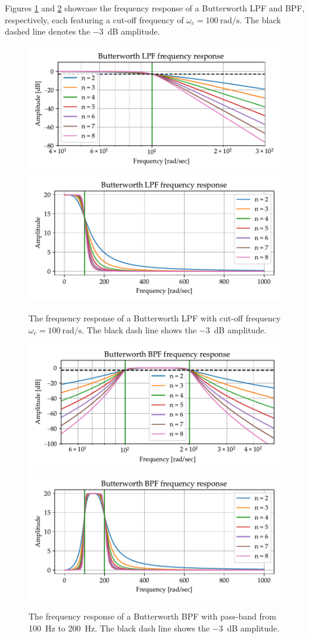 \documentclass[../ECE459FinalProjectReport.tex]{subfiles}
\begin{document}
Figures \ref{fig:butter-lpf} and \ref{fig:butter-bpf} showcase the frequency response of a Butterworth LPF and BPF, respectively, each featuring a cut-off frequency of $\omega_c = \SI{100}{\radian\per\s}$. The black dashed line denotes the \SI{-3}{\dB} amplitude.

\begin{figure}[htb]
    \centering
    \includegraphics[width=0.45\linewidth]{plots/butterworth-lpf.pdf}
    \includegraphics[width=0.45\linewidth]{plots/butterworth-lpf-nolog.pdf}
    \caption{The frequency response of a Butterworth LPF with cut-off frequency $\omega_c = \SI{100}{\radian\per\s}$. The black dash line shows the \SI{-3}{\dB} amplitude.}
    \label{fig:butter-lpf}
\end{figure}
\begin{figure}[htb]
    \centering
    \includegraphics[width=0.45\linewidth]{plots/butterworth-bpf.pdf}
    \includegraphics[width=0.45\linewidth]{plots/butterworth-bpf-nolog.pdf}
    \caption{The frequency response of a Butterworth BPF with pass-band from \SI{100}{Hz} to \SI{200}{Hz}. The black dash line shows the \SI{-3}{\dB} amplitude.}
    \label{fig:butter-bpf}
\end{figure}
\end{document}
